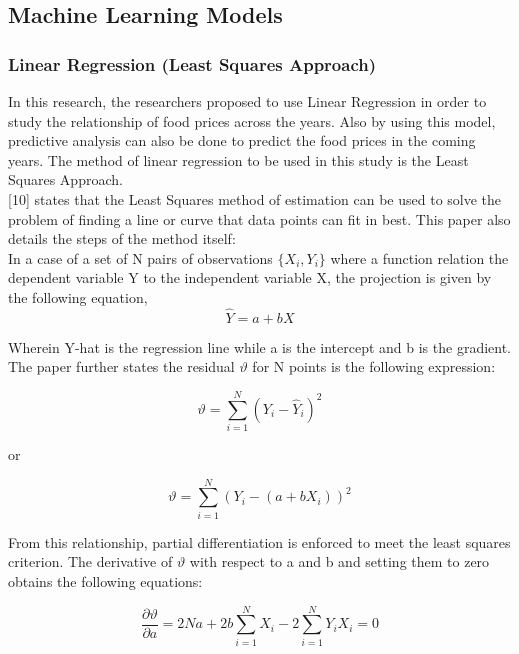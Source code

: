 \documentclass[runningheads]{llncs}
\begin{document}
\subsection{Machine Learning Models}
\subsubsection{Linear Regression (Least Squares Approach)}
In this research, the researchers proposed to use Linear Regression in order to study the relationship of food prices across the years. Also by using this model, predictive analysis can also be done to predict the food prices in the coming years. The method of linear regression to be used in this study is the Least Squares Approach. \\

[10] states that the Least Squares method of estimation can be used to solve the problem of finding a line or curve that data points can fit in best. This paper also details the steps of the method itself:\\

In a case of a set of N pairs of observations $\{X_i, Y_i\}$ where a function relation the dependent variable Y to the independent variable X, the projection is given by the following equation,
\begin{equation}
	\hat{Y} = a + bX
\end{equation}

Wherein Y-hat is the regression line while a is the intercept and b is the gradient. The paper further states the residual $\vartheta$ for N points is the following expression:

\begin{equation}
	\vartheta = \sum_{i=1}^{N} (Y_i - \hat{Y}_i)^2 
\end{equation}

\centerline{or}

\begin{equation}
	\vartheta = \sum_{i=1}^{N} (Y_i - (a + bX_i))^2 
\end{equation}

From this relationship, partial differentiation is enforced to meet the least squares criterion. The derivative of $\vartheta$ with respect to a and b and setting them to zero obtains the following equations:

\begin{equation}
	\frac{\partial\vartheta}{\partial a} = 2Na + 2b \sum_{i=1}^{N} X_i - 2\sum_{i=1}^{N} Y_i X_i = 0
\end{equation}
\end{document}
